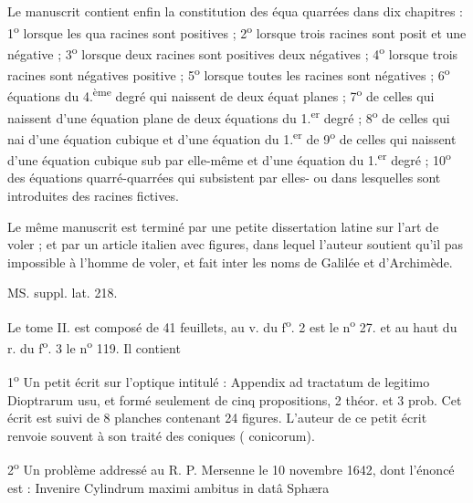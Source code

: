 \documentclass[11pt,a4paper]{article}
\begin{document}
Le manuscrit contient enfin la constitution des équa  quarrées dans dix chapitres : 1\textsuperscript{o} lorsque les qua racines sont positives ; 2\textsuperscript{o} lorsque trois racines sont posit et une négative ; 3\textsuperscript{o} lorsque deux racines sont positives
deux négatives ; 4\textsuperscript{o} lorsque trois racines sont négatives \ill{}
positive ; 5\textsuperscript{o} lorsque toutes les racines sont négatives ; 6\textsuperscript{o} \ill{}
équations du 4.\textsuperscript{ème} degré qui naissent de deux équat planes ; 7\textsuperscript{o} de celles qui naissent d'une équation plane \ill{} de deux équations du 1.\textsuperscript{er} degré ; 8\textsuperscript{o} de celles qui nai
d'une équation cubique et d'une équation du 1.\textsuperscript{er} de
9\textsuperscript{o} de celles qui naissent d'une équation cubique sub par elle-même et d'une équation du 1.\textsuperscript{er} degré ; 10\textsuperscript{o} \ill{}
des équations quarré-quarrées qui subsistent par elles- ou dans lesquelles sont introduites des racines fictives.

Le même manuscrit est terminé par une petite dissertation latine sur l'art de voler ; et par un article italien avec figures, dans lequel l'auteur soutient qu'il \ill{} pas impossible à l'homme de voler, et fait inter les noms de Galilée et d'Archimède.

MS. suppl. lat. 218.

Le tome II. est composé de 41 feuillets, au v. du f\textsuperscript{o}. 2 est le n\textsuperscript{o} 27. et au haut du r. du f\textsuperscript{o}. 3 le n\textsuperscript{o} 119. Il contient

1\textsuperscript{o} Un petit écrit sur l'optique intitulé : Appendix ad tractatum de legitimo Dioptrarum usu, et formé seulement de cinq propositions, 2 théor. et 3 prob. Cet écrit est suivi de 8 planches contenant 24 figures. L'auteur de ce petit écrit renvoie souvent à son traité des coniques (  conicorum).

2\textsuperscript{o} Un problème addressé au R. P. Mersenne le 10 novembre 1642, dont l'énoncé est : Invenire Cylindrum maximi ambitus in datâ Sphæra
\end{document}
